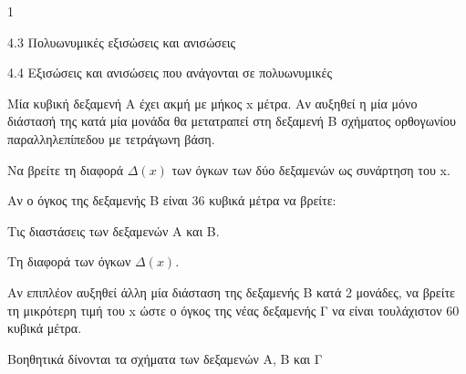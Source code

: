 \begin{ylh}{1}
\item 4.3 Πολυωνυμικές εξισώσεις και ανισώσεις
\item 4.4 Εξισώσεις και ανισώσεις που ανάγονται σε πολυωνυμικές
\end{ylh}
Μία κυβική δεξαμενή Α έχει ακμή με μήκος x μέτρα. Αν αυξηθεί η μία μόνο διάστασή της κατά μία μονάδα θα μετατραπεί στη δεξαμενή Β σχήματος ορθογωνίου παραλληλεπίπεδου με τετράγωνη βάση.
\begin{alist}
\item Να βρείτε τη διαφορά $\Delta(x)$ των όγκων των δύο δεξαμενών ως συνάρτηση του x.
\item Αν ο όγκος της δεξαμενής Β είναι 36 κυβικά μέτρα να βρείτε:
\begin{rlist}
\item Τις διαστάσεις των δεξαμενών Α και Β.
\item Τη διαφορά των όγκων $\Delta(x)$.
\end{rlist}
\item Αν επιπλέον αυξηθεί άλλη μία διάσταση της δεξαμενής Β κατά 2 μονάδες, να βρείτε τη μικρότερη τιμή του x ώστε ο όγκος της νέας δεξαμενής Γ να είναι τουλάχιστον 60 κυβικά μέτρα.
\end{alist}
Βοηθητικά δίνονται τα σχήματα των δεξαμενών Α, Β και Γ
